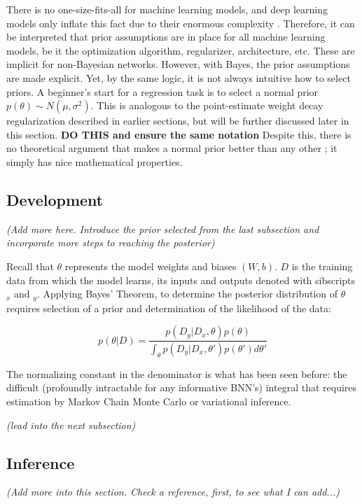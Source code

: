There is no one-size-fits-all for machine learning models, and deep learning models only inflate this fact due to their enormous complexity \cite{Goodfellow-et-al-2016}.  Therefore, it can be interpreted \cite{Jospin} that prior assumptions are in place for all machine learning models, be it the optimization algorithm, regularizer, architecture, etc. These are implicit for non-Bayesian networks.  However, with Bayes, the prior assumptions are made explicit.  Yet, by the same logic, it is not always intuitive how to select priors.  A beginner's start for a regression task is to select a normal prior $p(\theta) \sim N(\mu,\sigma^2)$.  This is analogous to the point-estimate weight decay regularization described in earlier sections, but will be further discussed later in this section. \textbf{DO THIS and ensure the same notation}  Despite this, there is no theoretical argument that makes a normal prior better than any other \cite{silvestro2020prior}; it simply has nice mathematical properties.


\subsection{Development}

\textit{(Add more here.  Introduce the prior selected from the last subsection and incorporate more steps to reaching the posterior)}

Recall that $\theta$ represents the model weights and biases $(W,b)$.  $D$ is the training data from which the model learns, its inputs and outputs denoted with sibscripts $_x$ and $_y$.  Applying Bayes' Theorem, to determine the posterior distribution of $\theta$ requires selection of a prior and determination of the likelihood of the data:

$$
p(\theta|D) = \frac{p(D_{y}|D_{x},\theta)p(\theta)}{\int_\theta p(D_{y}|D_{x},\theta')p(\theta')d\theta'}
$$

The normalizing constant in the denominator is what has been seen before: the difficult (profoundly intractable for any informative BNN's) integral that requires estimation by Markov Chain Monte Carlo or variational inference.

\textit{(lead into the next subsection)}

\subsection{Inference}

\textit{(Add more into this section.  Check a reference, first, to see what I can add...)}

